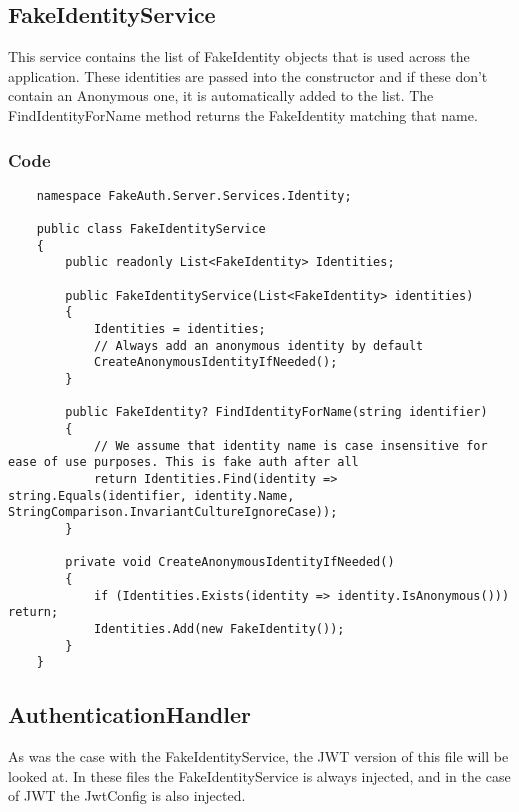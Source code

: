 \subsection{FakeIdentityService}

This service contains the list of FakeIdentity objects that is used across the application. These identities are passed into the constructor and if these don't contain an Anonymous one, it is automatically added to the list. The FindIdentityForName method returns the FakeIdentity matching that name.

\subsubsection{Code}

\begin{verbatim}
    namespace FakeAuth.Server.Services.Identity;
    
    public class FakeIdentityService
    {
        public readonly List<FakeIdentity> Identities;
        
        public FakeIdentityService(List<FakeIdentity> identities)
        {
            Identities = identities;
            // Always add an anonymous identity by default
            CreateAnonymousIdentityIfNeeded();
        }
        
        public FakeIdentity? FindIdentityForName(string identifier)
        {
            // We assume that identity name is case insensitive for ease of use purposes. This is fake auth after all
            return Identities.Find(identity => string.Equals(identifier, identity.Name, StringComparison.InvariantCultureIgnoreCase));
        }
        
        private void CreateAnonymousIdentityIfNeeded()
        {
            if (Identities.Exists(identity => identity.IsAnonymous())) return;
            Identities.Add(new FakeIdentity());
        }
    }
\end{verbatim}

\subsection{AuthenticationHandler}

As was the case with the FakeIdentityService, the JWT version of this file will be looked at. In these files the FakeIdentityService is always injected, and in the case of JWT the JwtConfig is also injected.

